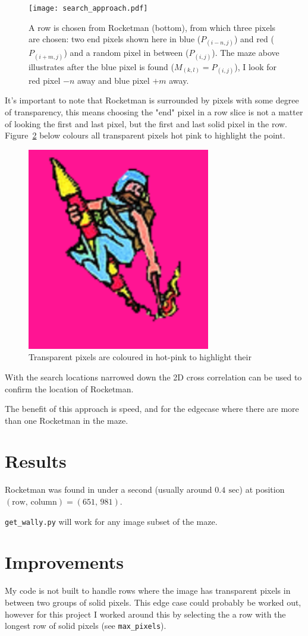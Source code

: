 \documentclass[prb,11pt,twocolumn]{revtex4-1}
\begin{document}
\begin{figure}
     \texttt{[image: search\_approach.pdf]}
     \caption{A row is chosen from Rocketman (bottom), from which three pixels are chosen: two end pixels shown here in blue ($P_{(i-n,j)}$) and red ($P_{(i+m,j)}$) and a random pixel in between ($P_{(i,j)}$). The maze above illustrates after the blue pixel is found ($M_{(k,l)}=P_{(i,j)}$), I look for red pixel $-n$ away and blue pixel $+m$ away.}
     \label{fig:pixel-search}
\end{figure}

It's important to note that Rocketman is surrounded by pixels with some degree of transparency, this means choosing the "end" pixel in a row slice is not a matter of looking the first and last pixel, but the first and last solid pixel in the row. Figure~\ref{fig:pixel-pink} below colours all transparent pixels hot pink to highlight the point.

\begin{figure}
     \includegraphics[width=8cm]{rocketman_hotpink.pdf}
     \caption{Transparent pixels are coloured in hot-pink to highlight their}
     \label{fig:pixel-pink}
\end{figure}

With the search locations narrowed down the 2D cross correlation can be used to confirm the location of Rocketman.

The benefit of this approach is speed, and for the edgecase where there are more than one Rocketman in the maze. 

\section{Results}
Rocketman was found in under a second (usually around $0.4\,~\mathrm{sec}$) at position $\mathrm{(row,\,column)}=(651,\,981)$.

\texttt{get\_wally.py} will work for any image subset of the maze.

\section{Improvements}
My code is not built to handle rows where the image has transparent pixels in between two groups of solid pixels. This edge case could probably be worked out, however for this project I worked around this by selecting the a row with the longest row of solid pixels (see \texttt{max\_pixels}).
\end{document}
